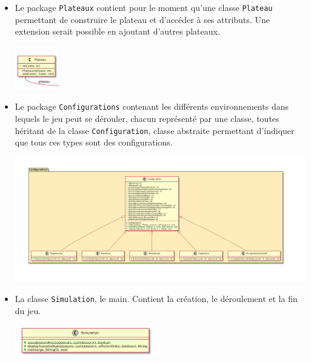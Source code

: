 \documentclass[11pt, a4paper]{report}
\begin{document}
\begin{itemize}
		\item Le package \verb|Plateaux| contient pour le moment qu'une classe \verb|Plateau| permettant de construire le plateau et d'accéder à ses attributs. Une extension serait possible en ajoutant d'autres plateaux.\\
		\begin{center}
			\includegraphics[width=0.15\textwidth]{images/UMLPlateaux.png}\\
		\end{center}
		
		\item Le package \verb|Configurations| contenant les différents environnements dans lequels le jeu peut se dérouler, chacun représenté par une classe, toutes héritant de la classe \verb|Configuration|, classe abstraite permettant d'indiquer que tous ces types sont des configurations.\\
		\begin{center}
			\includegraphics[width=1\textwidth]{images/UMLConfigurations.png}\\
		\end{center}
		
		\item La classe \verb|Simulation|, le main. Contient la création, le déroulement et la fin du jeu.\\
		\begin{center}
			\includegraphics[width=0.5\textwidth]{images/UMLSimulation.png}\\
		\end{center}
		
	\end{itemize}
	
\end{document}
